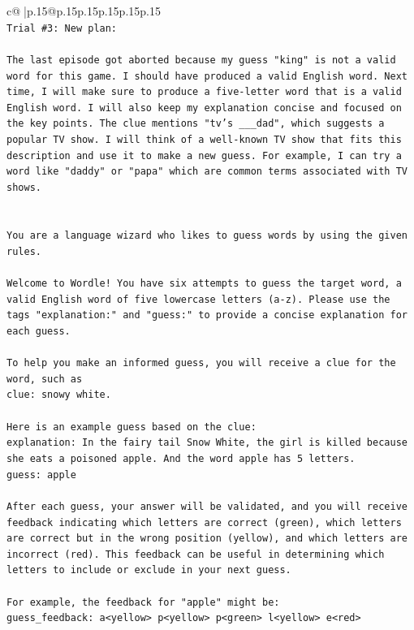 \documentclass{article}
\begin{document}
{\begin{supertabular}{c@{$\;$}|p{.15\linewidth}@{}p{.15\linewidth}p{.15\linewidth}p{.15\linewidth}p{.15\linewidth}p{.15\linewidth}}
{{{\\ 
\texttt{Trial \#3: New plan: } \\
\\ 
\texttt{The last episode got aborted because my guess "king" is not a valid word for this game. I should have produced a valid English word. Next time, I will make sure to produce a five{-}letter word that is a valid English word. I will also keep my explanation concise and focused on the key points. The clue mentions "tv's \_\_\_dad", which suggests a popular TV show. I will think of a well{-}known TV show that fits this description and use it to make a new guess. For example, I can try a word like "daddy" or "papa" which are common terms associated with TV shows.} \\
\\ 
\\ 
\texttt{You are a language wizard who likes to guess words by using the given rules.} \\
\\ 
\texttt{Welcome to Wordle! You have six attempts to guess the target word, a valid English word of five lowercase letters (a{-}z). Please use the tags "explanation:" and "guess:" to provide a concise explanation for each guess.} \\
\\ 
\texttt{To help you make an informed guess, you will receive a clue for the word, such as} \\
\texttt{clue: snowy white.} \\
\\ 
\texttt{Here is an example guess based on the clue:} \\
\texttt{explanation: In the fairy tail Snow White, the girl is killed because she eats a poisoned apple. And the word apple has 5 letters.} \\
\texttt{guess: apple} \\
\\ 
\texttt{After each guess, your answer will be validated, and you will receive feedback indicating which letters are correct (green), which letters are correct but in the wrong position (yellow), and which letters are incorrect (red). This feedback can be useful in determining which letters to include or exclude in your next guess.} \\
\\ 
\texttt{For example, the feedback for "apple" might be:} \\
\texttt{guess\_feedback: a<yellow> p<yellow> p<green> l<yellow> e<red>} \\
}}}
\end{supertabular}}
\end{document}
